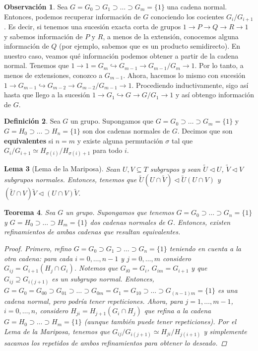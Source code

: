 \documentclass[12pt]{book}
\newtheorem{teo}{Teorema}[section]
\newtheorem{lem}[teo]{Lema}
\theoremstyle{definition}
\newtheorem{obs}[teo]{Observación}
\newtheorem{defn}[teo]{Definición}
\begin{document}
\begin{obs}
Sea $G=G_0\supset G_1\supset \ldots \supset G_m = \{1\}$ una cadena normal. Entonces, podemos recuperar información de $G$ conociendo los cocientes $G_{i}/G_{i+1}$. Es decir, si tenemos una sucesión exacta corta de grupos $1\longrightarrow P\longrightarrow Q\longrightarrow R\longrightarrow 1$ y sabemos información de $P$ y $R$, a menos de la extensión, conocemos alguna información de $Q$ (por ejemplo, sabemos que es un producto semidirecto).  En nuestro caso, veamos qué información podemos obtener a partir de la cadena normal. Tenemos que $1\longrightarrow 1=G_m\hookrightarrow G_{m-1}\longrightarrow G_{m-1}/G_m \longrightarrow 1$. Por lo tanto, a menos de extensiones, conozco a $G_{m-1}$. Ahora, hacemos lo mismo con sucesión $1\longrightarrow G_{m-1}\hookrightarrow G_{m-2}\longrightarrow G_{m-2}/G_{m-1} \longrightarrow 1$. Procediendo inductivamente, sigo así hasta que llego a la sucesión $1\longrightarrow G_1\hookrightarrow G\longrightarrow G/G_1\longrightarrow 1$ y así obtengo información de $G$.
\end{obs}

\begin{defn}
Sea $G$ un grupo. Supongamos que $G=G_0\supset\ldots\supset G_m = \{1\}$ y $G=H_0\supset\ldots\supset H_n=\{1\}$ son dos cadenas normales de $G$. Decimos que son \textbf{equivalentes} si $n=m$ y existe alguna permutación $\sigma$ tal que $G_{i}/G_{i+1}\simeq H_{\sigma(i)}/H_{\sigma(i)+1}$ para todo $i$.
\end{defn}

\begin{lem}[Lema de la Mariposa]
Sean $U,V\subseteq T$ subgrupos y sean $\widetilde{U}\triangleleft U$, $\widetilde{V}\triangleleft V$ subgrupos normales. Entonces, tenemos que $\widetilde{U}(U\cap\widetilde{V})\triangleleft \widetilde{U}(U\cap V)$ y $(\widetilde{U}\cap V)\widetilde{V}\triangleleft (U\cap V)\widetilde{V}$.
\end{lem}

\begin{teo}
Sea $G$ un grupo. Supongamos que tenemos $G=G_0\supset\ldots\supset G_n = \{1\}$ y $G=H_0\supset\ldots\supset H_m=\{1\}$ dos cadenas normales de $G$. Entonces, existen refinamientos de ambas cadenas que resultan equivalentes.
\begin{proof}
Primero, refino $G=G_0\supset G_1\supset\ldots\supset G_n=\{1\}$ teniendo en cuenta a la otra cadena: para cada $i=0,\ldots , n-1$ y $j=0,\ldots , m$ considero $G_{ij}=G_{i+1}(H_j\cap G_i)$. Notemos que $G_{i0}=G_i$, $G_{im}=G_{i+1}$ y que $G_{ij}\supseteq G_{i(j+1)}$ es un subgrupo normal. Entonces, $G=G_0=G_{00}\supset G_{01}\supset\ldots\supset G_{0m}=G_1 = G_{10}\supset \ldots\supset G_{(n-1)m}=\{1\}$ es una cadena normal, pero podría tener repeticiones. Ahora, para $j=1,\ldots , m-1$, $i=0,\ldots ,n$, considero $H_{ji}=H_{j+1}(G_i\cap H_j)$ que refina a la cadena $G=H_0\supset\ldots \supset H_m=\{1\}$ (aunque también puede tener repeticiones). Por el Lema de la Mariposa, tenemos que $G_{ij}/G_{i(j+1)}\simeq H_{ji}/H_{j(i+1)}$ y simplemente sacamos los repetidos de ambos refinamientos para obtener lo deseado.
\end{proof}
\end{teo}
\end{document}
